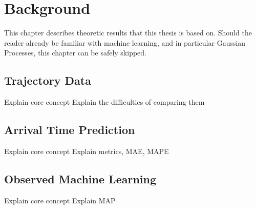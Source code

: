 \chapter{Background}
This chapter describes theoretic results that this thesis is based
on. Should the reader already be familiar with machine learning, and
in particular Gaussian Processes, this chapter can be safely skipped.

\section{Trajectory Data}
Explain core concept
Explain the difficulties of comparing them

\section{Arrival Time Prediction}
Explain core concept
Explain metrics, MAE, MAPE

\section{Observed Machine Learning}
Explain core concept
Explain MAP

